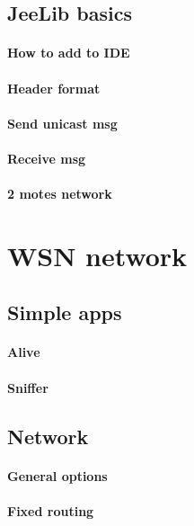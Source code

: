 \documentclass[12pt,titlepage]{article}
\begin{document}
	\subsection{JeeLib basics}
		\paragraph{How to add to IDE}
		\paragraph{Header format}
		\paragraph{Send unicast msg}
		\paragraph{Receive msg}
		\paragraph{2 motes network}

\section{WSN network}
	\subsection{Simple apps}
		\paragraph{Alive}
		\paragraph{Sniffer}

	\subsection{Network}
		\paragraph{General options}
		\paragraph{Fixed routing}
\end{document}

